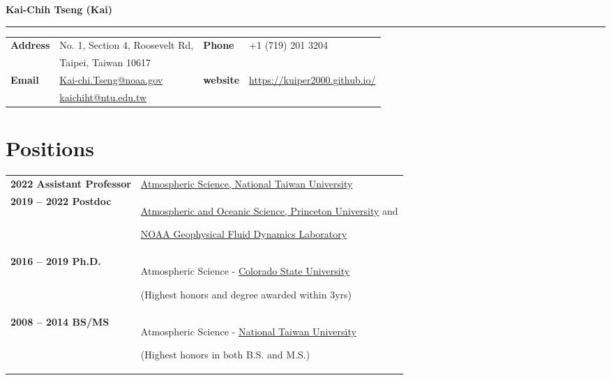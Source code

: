\documentclass{article}
\begin{document}
{\huge\color{airforceblue}\textbf{Kai-Chih Tseng (Kai)}\par}
\rule{\textwidth}{0.5mm}\par

\vspace{5ex}

\begin{tabular}{
		>{\bfseries}p{.20\linewidth}
		p{.4\linewidth}
		>{\bfseries}p{.1\linewidth}
		p{.25\linewidth}
	}
	Address       & No. 1, Section 4, Roosevelt Rd,          &  Phone  & +1 (719) 201 3204\\
	              & Taipei, Taiwan 10617          &    &  \\
	Email         & \href{mailto:Kai-chi.Tseng@noaa.gov}{Kai-chi.Tseng@noaa.gov} & website & \href{https://kuiper2000.github.io/}{https://kuiper2000.github.io/}    \\
                  & \href{mailto:kaichiht@princeton.edu}{kaichiht@ntu.edu.tw} &       &     \\
\end{tabular}

\section{\color{airforceblue}Positions}
\begin{tabular}{>{\bfseries}p{5cm}p{\linewidth-2.5cm\relax}}
	2022 Assistant Professor   & \href{https://www.princeton.edu/}{Atmospheric Science, National Taiwan University}\par 
	\\
	2019  -- 2022 Postdoc & \href{https://www.princeton.edu/}{Atmospheric and Oceanic Science, Princeton University} and \par \href{https://www.gfdl.noaa.gov/}{NOAA Geophysical Fluid Dynamics Laboratory} \par
    \\
	2016 -- 2019 Ph.D. & Atmospheric Science -
	\href{https://www.colostate.edu/}{Colorado State University} \par
	(Highest honors and degree awarded within 3yrs) \par
	\\
	2008 -- 2014 BS/MS & Atmospheric Science - \href{https://www.ntu.edu.tw/}{National Taiwan University} \par 
	(Highest honors in both B.S. and M.S.) 

\end{tabular}
\end{document}
